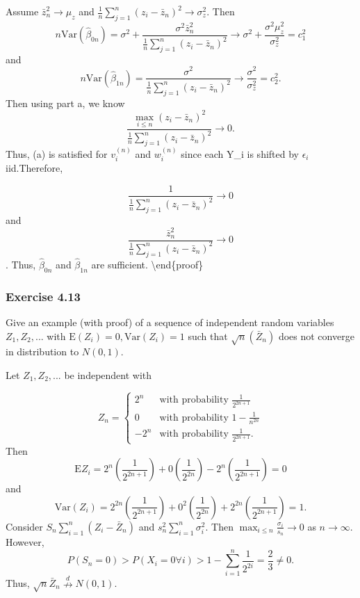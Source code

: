 \documentclass[12pt,]{article}
\begin{document}
Assume \(\bar z_n^2\rightarrow \mu_z\) and
\(\frac{1}{n}\sum_{j=1}^n(z_i-\bar z_n)^2\rightarrow\sigma_z^2.\) Then
\[n\text{Var}(\hat\beta_{0n})=\sigma^2+\frac{\sigma^2 \bar z_n^2}{\frac{1}{n}\sum_{j=1}^n(z_i-\bar z_n)^2}\rightarrow \sigma^2+\frac{\sigma^2\mu_z^2}{\sigma_z^2}=c_1^2\]
and
\[n\text{Var}(\hat\beta_{1n})=\frac{\sigma^2}{\frac{1}{n}\sum_{j=1}^n(z_i-\bar z_n)^2}\rightarrow \frac{\sigma^2}{\sigma_z^2}=c_2^2.\]
Then using part a, we know
\[\frac{\max_{i\le n}(z_i-\bar z_n)^2}{\frac{1}{n}\sum_{j=1}^n(z_i-\bar z_n)^2}\rightarrow 0.\]
Thus, (a) is satisfied for \(v_i^{(n)}\) and \(w_i^{(n)}\) since each
Y\_i is shifted by \(\epsilon_i\) iid.Therefore,

\[\frac{1}{\frac{1}{n}\sum_{j=1}^n(z_i-\bar z_n)^2}\rightarrow 0\] and
\[\frac{\bar z_n^2}{\frac{1}{n}\sum_{j=1}^n(z_i-\bar z_n)^2}\rightarrow 0\].
Thus, \(\hat\beta_{0n}\) and \(\hat\beta_{1n}\) are sufficient.
\textbackslash{}end\{proof\}

\hypertarget{exercise-4.13}{%
\subsubsection{Exercise 4.13}\label{exercise-4.13}}

Give an example (with proof) of a sequence of independent random
variables \(Z_1, Z_2, ...\) with \(\text{E}(Z_i)=0, \text{Var}(Z_i)=1\)
such that \(\sqrt{n}(\bar Z_n)\) does not converge in distribution to
\(N(0,1).\)

Let \(Z_1, Z_2, ...\) be independent with

\[Z_n = \begin{cases}
                                   2^n & \text{with probability $\frac{1}{2^{2n+1}}$} \\
                                   0 & \text{with probability $1-\frac{1}{n^{2n}}$} \\
                                  -2^n & \text{with probability $\frac{1}{2^{2n+1}}$}.
        \end{cases}\] Then
\[\text{E}Z_i=2^n\left(\frac{1}{2^{2n+1}}\right) + 0\left(\frac{1}{2^{2n}}\right) - 2^n\left(\frac{1}{2^{2n+1}}\right)=0\]
and
\[\text{Var}(Z_i)=2^{2n}\left(\frac{1}{2^{2n+1}}\right) + 0^2\left(\frac{1}{2^{2n}}\right) + 2^{2n}\left(\frac{1}{2^{2n+1}}\right)=1.\]
Consider \(S_n \sum_{i=1}^n(Z_i-\bar Z_n)\) and
\(s_n^2\sum_{i=1}^n \sigma_i^2.\) Then
\(\max_{i\le n}\frac{\sigma_i}{s_n}\rightarrow 0\) as
\(n\rightarrow \infty.\) However,
\[P(S_n=0)>P(X_i=0 \forall i)>1-\sum_{i=1}^n\frac{1}{2^{2i}}=\frac{2}{3} \ne 0.\]
Thus, \(\sqrt{n}\bar Z_n \overset{d}\nrightarrow N(0,1).\)
\end{document}
